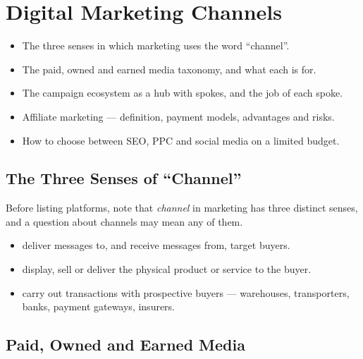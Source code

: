 \documentclass{MMTextbook}
\begin{document}
\chapter{Digital Marketing Channels}


\begin{learningoutcomes}
\begin{itemize}
\item The three senses in which marketing uses the word ``channel''.
\item The paid, owned and earned media taxonomy, and what each is for.
\item The campaign ecosystem as a hub with spokes, and the job of each spoke.
\item Affiliate marketing --- definition, payment models, advantages and risks.
\item How to choose between SEO, PPC and social media on a limited budget.
\end{itemize}
\end{learningoutcomes}

\section{The Three Senses of ``Channel''}

Before listing platforms, note that \emph{channel} in marketing has three
distinct senses, and a question about channels may mean any of them.

\begin{itemize}
\item {} deliver messages to, and receive messages
      from, target buyers.
\item {} display, sell or deliver the physical product
      or service to the buyer.
\item {} carry out transactions with prospective buyers ---
      warehouses, transporters, banks, payment gateways, insurers.
\end{itemize}

\section{Paid, Owned and Earned Media}
\end{document}
